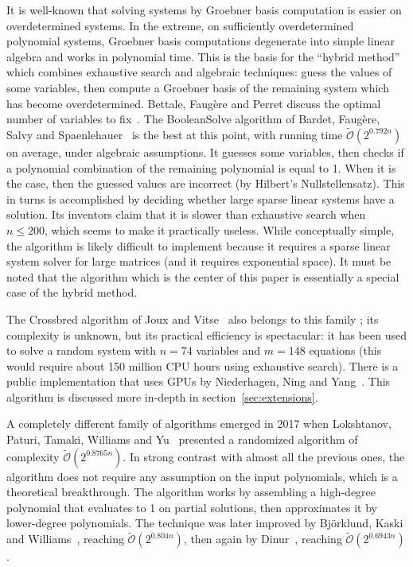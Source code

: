 \documentclass[a4paper,UKenglish,cleveref, autoref]{lipics-v2019}
\newcommand{\bigOsoft}[1]{\ensuremath{\mathcal{\tilde O}\left( #1 \right)} }
\begin{document}
It is well-known that solving systems by Groebner basis computation is easier on
overdetermined systems. In the extreme, on sufficiently overdetermined
polynomial systems, Groebner basis computations degenerate into simple linear
algebra and works in polynomial time. This is the basis for the ``hybrid
method'' which combines exhaustive search and algebraic techniques: guess the
values of some variables, then compute a Groebner basis of the remaining system
which has become overdetermined. Bettale, Faugère and Perret discuss the optimal
number of variables to fix~\cite{BettaleFP09}. The \textsf{BooleanSolve}
algorithm of Bardet, Faugère, Salvy and Spaenlehauer~\cite{BardetFSS13} is the
best at this point, with running time $\bigOsoft{2^{0.792n}}$ on average, under
algebraic assumptions. It guesses some variables, then checks if a polynomial
combination of the remaining polynomial is equal to 1. When it is the case, then
the guessed values are incorrect (by Hilbert's Nullstellensatz). This in turns
is accomplished by deciding whether large sparse linear systems have a
solution. Its inventors claim that it is slower than exhaustive search when
$n \leq 200$, which seems to make it practically useless. While conceptually
simple, the algorithm is likely difficult to implement because it requires a
sparse linear system solver for large matrices (and it requires exponential
space). It must be noted that the algorithm which is the center of this paper is
essentially a special case of the hybrid method.

The \textsf{Crossbred} algorithm of Joux and Vitse~\cite{JouxV17} also belongs
to this family ; its complexity is unknown, but its practical efficiency is
spectacular: it has been used to solve a random system with $n = 74$ variables
and $m=148$ equations (this would require about 150 million CPU hours using
exhaustive search). There is a public implementation that uses GPUs by
Niederhagen, Ning and Yang~\cite{NiederhagenNY18}. This algorithm is discussed
more in-depth in section~\ref{sec:extensions}.

A completely different family of algorithms emerged in 2017 when Lokshtanov,
Paturi, Tamaki, Williams and Yu~\cite{LokshtanovPTWY17} presented a randomized
algorithm of complexity $\bigOsoft{2^{0.8765n}}$. In strong contrast with almost
all the previous ones, the algorithm does not require any assumption on the
input polynomials, which is a theoretical breakthrough. The algorithm works by
assembling a high-degree polynomial that evaluates to 1 on partial solutions,
then approximates it by lower-degree polynomials. The technique was later
improved by Björklund, Kaski and Williams~\cite{BjorklundK019}, reaching
$\bigOsoft{2^{0.804n}}$, then again by Dinur~\cite{Dinur21}, reaching
$\bigOsoft{2^{0.6943n}}$.
\end{document}
